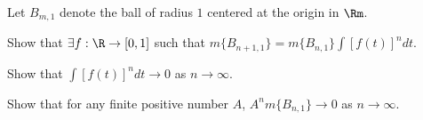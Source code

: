 Let $B_{m,1}$ denote the ball of radius $1$ centered at the origin in
$\Rm$.
\begin{alist}
\item Show that $\exists f:\R\rightarrow [0,1]$ such that
$m\{B_{n+1,1}\}=m\{B_{n,1}\}\int [f(t)]^n dt$.
\item Show that $\int[f(t)]^n dt\rightarrow 0$ as $n\rightarrow
\infty$.
\item Show that for any finite positive number $A$, $A^n
m\{B_{n,1}\}\rightarrow 0$ as $n\rightarrow \infty$.
\end{alist}

